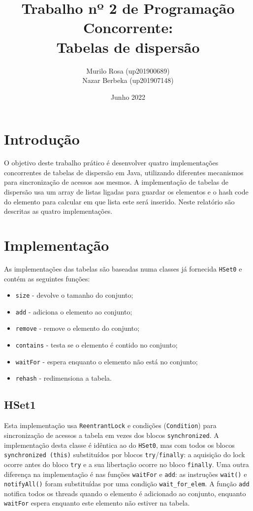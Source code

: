 \documentclass{report}
\title{Trabalho nº 2 de Programação Concorrente:\\Tabelas de dispersão}
\author{Murilo Rosa (up201900689)\\Nazar Berbeka (up201907148)}
\date{Junho 2022}
\begin{document}
\maketitle
\tableofcontents

\newpage

\section{Introdução}
O objetivo deste trabalho prático é desenvolver quatro implementações concorrentes de tabelas de dispersão em Java, utilizando diferentes mecanismos para sincronização de acessos aos mesmos. A implementação de tabelas de dispersão usa um array de listas ligadas para guardar os elementos e o hash code do elemento para calcular em que lista este será inserido. Neste relatório são descritas as quatro implementações.

\section{Implementação}
As implementações das tabelas são baseadas numa classes já fornecida \texttt{HSet0} e contém as seguintes funções:

\begin{itemize}
\item \texttt{size} - devolve o tamanho do conjunto;
\item \texttt{add} - adiciona o elemento ao conjunto;
\item \texttt{remove} - remove o elemento do conjunto;
\item \texttt{contains} - testa se o elemento é contido no conjunto;
\item \texttt{waitFor} - espera enquanto o elemento não está no conjunto;
\item \texttt{rehash} - redimensiona a tabela.
\end{itemize}

\subsection{HSet1}
Esta implementação usa \texttt{ReentrantLock} e condições (\texttt{Condition}) para sincronização de acessos a tabela em vezes dos blocos \texttt{synchronized}. A implementação desta classe é idêntica ao do \texttt{HSet0}, mas com todos os blocos \texttt{synchronized (this)} substituídos por blocos \texttt{try}/\texttt{finally}: a aquisição do lock ocorre antes do bloco \texttt{try} e a sua libertação ocorre no bloco \texttt{finally}. Uma outra diferença na implementação é nas funções \texttt{waitFor} e \texttt{add}: as instruções \texttt{wait()} e \texttt{notifyAll()} foram substituídas por uma condição \texttt{wait\_for\_elem}. A função \texttt{add} notifica todos os threads quando o elemento é adicionado ao conjunto, enquanto \texttt{waitFor} espera enquanto este elemento não estiver na tabela.
\end{document}
